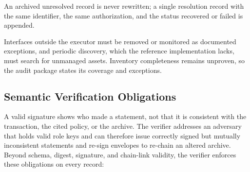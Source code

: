 \documentclass[journal]{IEEEtran}
\begin{document}
An archived unresolved record is never rewritten; a single resolution record with the same identifier, the same authorization, and the status recovered or failed is appended.

Interfaces outside the executor must be removed or monitored as documented exceptions, and periodic discovery, which the reference implementation lacks, must search for unmanaged assets. Inventory completeness remains unproven, so the audit package states its coverage and exceptions.

\subsection{Semantic Verification Obligations}
\label{sec:semantic}
A valid signature shows who made a statement, not that it is consistent with the transaction, the cited policy, or the archive. The verifier addresses an adversary that holds valid role keys and can therefore issue correctly signed but mutually inconsistent statements and re-sign envelopes to re-chain an altered archive. Beyond schema, digest, signature, and chain-link validity, the verifier enforces these obligations on every record:
\end{document}
